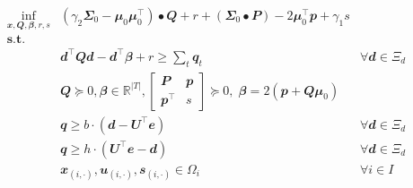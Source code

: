 \documentclass[
  a4paper,
,tablecaptionabove
]{scrartcl}
\numberwithin{equation}{section}
\begin{document}
\[\begin{aligned}
    \inf_{\mathbfit{x}, \mathbfit{Q}, \mathbfit{\beta}, r, s} & \left(\gamma_{2} \mathbfit{\Sigma}_{0}-\mathbfit{\mu}_{0} \mathbfit{\mu}_{0}^{\top}\right) \bullet \mathbfit{Q}+r+\left(\mathbfit{\Sigma}_{0} \bullet \mathbfit{P}\right)-2 \mathbfit{\mu}_{0}^{\top} \mathbfit{p} + \gamma_{1} s                                 \\
    \mathbf { s.t. }                                          &                                                                                                                                                                                                                                                                   \\
                                                              & \mathbfit{d}^{\top} \mathbfit{Q} \mathbfit{d} -\mathbfit{d^\top\beta} + r \ge \sum_t \mathbfit q_t                                                                                                                                & \forall \mathbfit d \in \Xi_d \\
                                                              & \mathbfit{Q} \succeq 0, \mathbfit{\beta} \in \mathbb{R}^{|T|},
    \begin{bmatrix}
      \mathbfit{P}      & \mathbfit{p} \\
      \mathbfit{p}^\top & s
    \end{bmatrix} \succeq 0, \;
    \mathbfit \beta = 2 (\mathbfit p + \mathbfit{Q\mu}_0)                                                                                                                                                                                                                                                                         \\
                                                              & \mathbfit q \ge b\cdot \left (\mathbfit d - \mathbfit U^\top \mathbfit{e} \right)                                                                                                                                                 & \forall \mathbfit d \in \Xi_d \\
                                                              & \mathbfit q \ge h\cdot \left ( \mathbfit U^\top \mathbfit{e}  - \mathbfit d \right )                                                                                                                                              & \forall \mathbfit d \in \Xi_d \\
                                                              & \mathbfit x_{(i,\cdot)}, \mathbfit u_{(i,\cdot)}, \mathbfit s_{(i,\cdot)} \in \Omega_i                                                                                                                                            & \forall i\in I
  \end{aligned}\]
\end{document}
